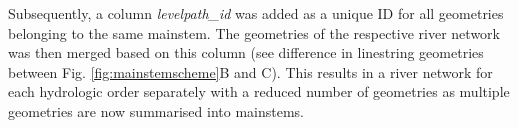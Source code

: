 \documentclass[fleqn,10pt]{wlscirep}
\newenvironment{Shaded}{\begin{snugshade}}{\end{snugshade}}
\newcommand{\AttributeTok}[1]{\textcolor[rgb]{0.77,0.63,0.00}{#1}}
\newcommand{\ConstantTok}[1]{\textcolor[rgb]{0.00,0.00,0.00}{#1}}
\newcommand{\ControlFlowTok}[1]{\textcolor[rgb]{0.13,0.29,0.53}{\textbf{#1}}}
\newcommand{\DecValTok}[1]{\textcolor[rgb]{0.00,0.00,0.81}{#1}}
\newcommand{\FunctionTok}[1]{\textcolor[rgb]{0.00,0.00,0.00}{#1}}
\newcommand{\NormalTok}[1]{#1}
\newcommand{\OtherTok}[1]{\textcolor[rgb]{0.56,0.35,0.01}{#1}}
\newcommand{\SpecialCharTok}[1]{\textcolor[rgb]{0.00,0.00,0.00}{#1}}
\newcommand{\StringTok}[1]{\textcolor[rgb]{0.31,0.60,0.02}{#1}}
\begin{document}
\begin{Shaded}
\end{Shaded}

\normalsize

Subsequently, a column \emph{levelpath\_id} was added as a unique ID for all geometries belonging to the same mainstem. The geometries of the respective river network was then merged based on this column (see difference in linestring geometries between Fig. \ref{fig:mainstemscheme}B and C). This results in a river network for each hydrologic order separately with a reduced number of geometries as multiple geometries are now summarised into mainstems.
\end{document}
